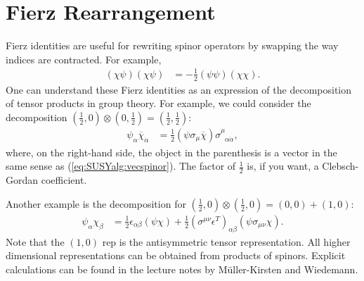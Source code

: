 \section{Fierz Rearrangement}\label{sec:SUSYalg:Fierz}

Fierz identities are useful for rewriting spinor operators by swapping the way indices are contracted. For example,
\begin{align}
    (\chi\psi)(\chi\psi) &= -\frac 12 (\psi\psi)(\chi\chi)\label{eq:SUSYalg:Fierz:alphaalphadot}.
\end{align}
%
One can understand these Fierz identities as an expression of the decomposition of tensor products in group theory. For example, we could consider the decomposition $(\frac 12,0)\otimes(0,\frac 12)=(\frac 12, \frac 12)$:
\begin{align}
    \psi_\alpha\overline\chi_{\dot\alpha} &= \frac 12 (\psi\sigma_\mu\overline\chi)\sigma^{\mu}_{\phantom\mu\alpha\dot\alpha},\label{eq:SUSYalg:fierz:sigma}
\end{align}
where, on the right-hand side, the object in the parenthesis is a vector in the same sense as  (\ref{eq:SUSYalg:vecspinor}). The factor of $\frac 12$ is, if you want, a Clebsch-Gordan coefficient.

Another example is the decomposition for $(\frac 12,0)\otimes(\frac 12,0)=(0,0)+(1,0)$:
\begin{align}
    \psi_\alpha\chi_\beta &= \frac 12 \epsilon_{\alpha\beta}(\psi\chi) + \frac 12 (\sigma^{\mu\nu}\epsilon^T)_{\alpha\beta}(\psi\sigma_{\mu\nu}\chi).
\end{align}
Note that the $(1,0)$ rep is the antisymmetric tensor representation. All higher dimensional representations can be obtained from products of spinors. Explicit calculations can be found in the lecture notes by M\"uller-Kirsten and Wiedemann\autocite{MullerKirsten:1986cw}.

